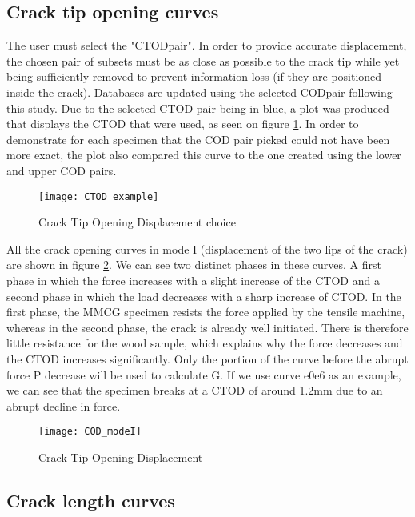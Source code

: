 \subsection{Crack tip opening curves}

The user must select the "CTODpair". In order to provide accurate displacement, the chosen pair of subsets must be as close as possible to the crack tip while yet being sufficiently removed to prevent information loss (if they are positioned inside the crack). Databases are updated using the selected CODpair following this study. Due to the selected CTOD pair being in blue, a plot was produced that displays the CTOD that were used, as seen on figure \ref{fig:CTOD_example}. In order to demonstrate for each specimen that the COD pair picked could not have been more exact, the plot also compared this curve to the one created using the lower and upper COD pairs.

\begin{figure}[htp]
	\centering
	\texttt{[image: CTOD\_example]}
	\caption{Crack Tip Opening Displacement choice}
	\label{fig:CTOD_example}
\end{figure}

All the crack opening curves in mode I (displacement of the two lips of the crack) are shown in figure \ref{fig:COD_modeI}. 
We can see two distinct phases in these curves. A first phase in which the force increases with a slight increase of the CTOD and a second phase in which the load decreases with a sharp increase of CTOD. In the first phase, the MMCG specimen resists the force applied by the tensile machine, whereas in the second phase, the crack is already well initiated. There is therefore little resistance for the wood sample, which explains why the force decreases and the CTOD increases significantly.
Only the portion of the curve before the abrupt force P decrease will be used to calculate G. If we use curve e0e6 as an example, we can see that the specimen breaks at a CTOD of around 1.2mm due to an abrupt decline in force.

\begin{figure}[htp]
	\centering
	\texttt{[image: COD\_modeI]}
	\caption{Crack Tip Opening Displacement}
	\label{fig:COD_modeI}
\end{figure}

\subsection{Crack length curves}

